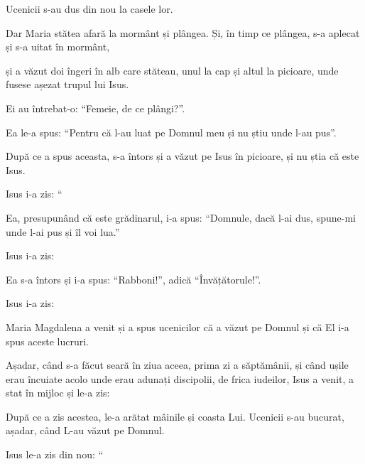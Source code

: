 {Ucenicii s-au dus din nou la casele lor.


\par }{\PP {}Dar Maria stătea afară la mormânt și plângea. Și, în timp ce plângea, s-a aplecat și s-a uitat în mormânt,

și a văzut doi îngeri în alb care stăteau, unul la cap și altul la picioare, unde fusese așezat trupul lui Isus.

Ei au întrebat-o: “Femeie, de ce plângi?”.

\par }{\PP Ea le-a spus: “Pentru că l-au luat pe Domnul meu și nu știu unde l-au pus”.

După ce a spus aceasta, s-a întors și a văzut pe Isus în picioare, și nu știa că este Isus.


\par }{\PP {}Isus i-a zis: “{}

\par }{\PP Ea, presupunând că este grădinarul, i-a spus: “Domnule, dacă l-ai dus, spune-mi unde l-ai pus și îl voi lua.”


\par }{\PP {}Isus i-a zis:
{}

\par }{\PP Ea s-a întors și i-a spus: “Rabboni!”, adică “Învățătorule!”.


\par }{\PP {}Isus i-a zis:
{}


\par }{\PP {}Maria Magdalena a venit și a spus ucenicilor că a văzut pe Domnul și că El i-a spus aceste lucruri.

Așadar, când s-a făcut seară în ziua aceea, prima zi a săptămânii, și când ușile erau încuiate acolo unde erau adunați discipolii, de frica iudeilor, Isus a venit, a stat în mijloc și le-a zis:
{}


\par }{\PP {}După ce a zis acestea, le-a arătat mâinile și coasta Lui. Ucenicii s-au bucurat, așadar, când L-au văzut pe Domnul.

Isus le-a zis din nou: “{}

}
